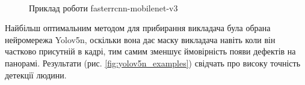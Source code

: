 \begin{figure}[H]
    \centering
    \\
    \caption{Приклад роботи fasterrcnn-mobilenet-v3
        \label{fig:fasterrcnn_examples}
    }
\end{figure}

Найбільш оптимальним методом для прибирання викладача була обрана нейромережа Yolov5n, оскільки вона
дає маску викладача навіть коли він частково присутній в кадрі, тим самим зменшує ймовірність появи
дефектів на панорамі. Результати (рис. \ref{fig:yolov5n_examples}) свідчать про високу точність детекції
людини.

